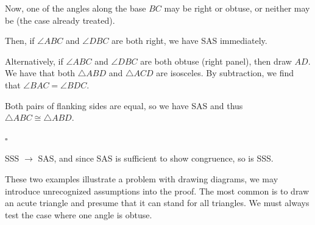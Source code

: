 \documentclass[11pt, oneside]{article}
\begin{document}
Now, one of the angles along the base $BC$ may be right or obtuse, or neither may be (the case already treated).

Then, if $\angle ABC$ and $\angle DBC$ are both right, we have SAS immediately.

Alternatively, if $\angle ABC$ and $\angle DBC$ are both obtuse (right panel), then draw $AD$.  We have that both $\triangle ABD$ and $\triangle ACD$ are isosceles.  By subtraction, we find that $\angle BAC = \angle BDC$.  

Both pairs of flanking sides are equal, so we have SAS and thus $\triangle ABC \cong \triangle ABD$.

$\square$

SSS $\rightarrow$ SAS, and since SAS is sufficient to show congruence, so is SSS.

These two examples illustrate a problem with drawing diagrams, we may introduce unrecognized assumptions into the proof.  The most common is to draw an acute triangle and presume that it can stand for all triangles.  We must always test the case where one angle is obtuse.
\end{document}
